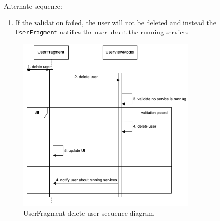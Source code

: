 Alternate sequence:
\begin{enumerate}[start=4]
    \item If the validation failed, the user will not be deleted and instead the \texttt{UserFragment} notifies the user about the running services.
\end{enumerate}


\begin{figure}[H]
    \centering
    \includegraphics[width=0.8\textwidth]{diagrams/delete-user-frag-seq.drawio.png}
    \caption{UserFragment delete user sequence diagram}
    \label{fig:userfragment_delete_user}
\end{figure}